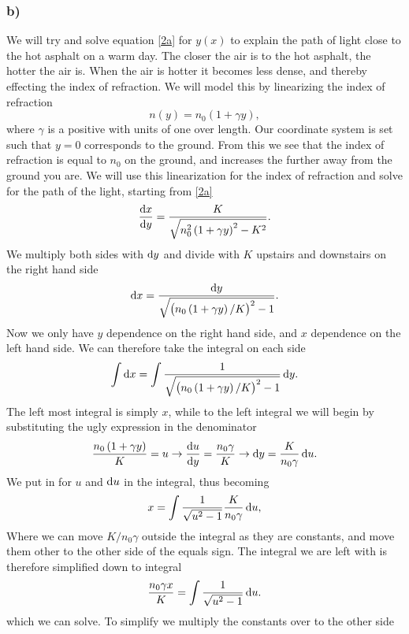 \documentclass[12pt,twoside]{article}
\begin{document}
\subsubsection*{b)}
We will try and solve equation \eqref{2a} for $y(x)$ to explain the path of light close to the hot asphalt on a warm day. The closer the air is to the hot asphalt, the hotter the air is. When the air is hotter it becomes less dense, and thereby effecting the index of refraction. We will model this by linearizing the index of refraction
\begin{equation}
  n\left(y\right) = n_0\left(1+\gamma y\right),
\end{equation}
where $\gamma$ is a positive with units of one over length. Our coordinate system is set such that $y=0$ corresponds to the ground. From this we see that the index of refraction is equal to $n_0$ on the ground, and increases the further away from the ground you are. We will use this linearization for the index of refraction and solve for the path of the light, starting from \eqref{2a}
\begin{equation}
   \frac{\dif x}{\dif y} = \frac{K}{\sqrt{n_0^2\left(1+\gamma y\right)^2-K^2}}.
\end{equation}
We multiply both sides with $\dif y$ and divide with $K$ upstairs and downstairs on the right hand side
\begin{equation}
   \dif x = \frac{\dif y}{\sqrt{\left(n_0\left(1+\gamma y\right)/K\right)^2-1}}.
\end{equation}
Now we only have $y$ dependence on the right hand side, and $x$ dependence on the left hand side. We can therefore take the integral on each side
\begin{equation}
   \int \dif x = \int \frac{1}{\sqrt{\left(n_0\left(1+\gamma y\right)/K\right)^2-1}} \dif y.
\end{equation}
The left most integral is simply $x$, while to the left integral we will begin by substituting the ugly expression in the denominator
\begin{equation}
  \frac{n_0\left(1+\gamma y\right)}{K} = u \rightarrow \frac{\dif u}{\dif y} = \frac{n_0\gamma}{K} \rightarrow \dif y = \frac{K}{n_0\gamma} \dif u.
\end{equation}
We put in for $u$ and $\dif u$ in the integral, thus becoming
\begin{equation}
   x = \int \frac{1}{\sqrt{u^2-1}} \frac{K}{n_0\gamma} \dif u,
\end{equation}
Where we can move $K/n_0\gamma$ outside the integral as they are constants, and move them other to the other side of the equals sign. The integral we are left with is therefore simplified down to integral
\begin{equation}
   \frac{n_0\gamma x}{K} = \int \frac{1}{\sqrt{u^2-1}} \dif u.
\end{equation}
which we can solve. To simplify we multiply the constants over to the other side
%
%
\end{document}
